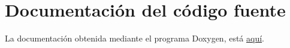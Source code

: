 

\section{Documentación del código fuente}

La documentación obtenida mediante el programa Doxygen, está \href{html/index.html}{aquí}.


